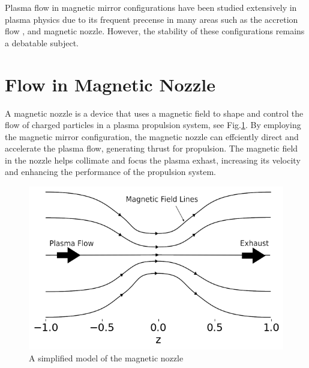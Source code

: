 Plasma flow in magnetic mirror configurations have been studied extensively in plasma physics due to its frequent precense in many areas such as the accretion flow \cite{jockers_stability_1968,aikawa_stability_1979}, and magnetic nozzle\cite{smolyakov_quasineutral_2021}. However, the stability of these configurations remains a debatable subject.

\section{Flow in Magnetic Nozzle}
A magnetic nozzle is a device that uses a magnetic field to shape and control the flow of charged particles in a plasma propulsion system, see Fig.\ref{fig:magnetic-nozzle}. By employing the magnetic mirror configuration, the magnetic nozzle can effciently direct and accelerate the plasma flow, generating thrust for propulsion. The magnetic field in the nozzle helps collimate and focus the plasma exhast, increasing its velocity and enhancing the performance of the propulsion system.

\begin{figure}[htbp]
  \centering
  \includegraphics[width=0.7\linewidth]{figures/magnetic-nozzle}
  \caption{A simplified model of the magnetic nozzle}
  \label{fig:magnetic-nozzle}
\end{figure}

